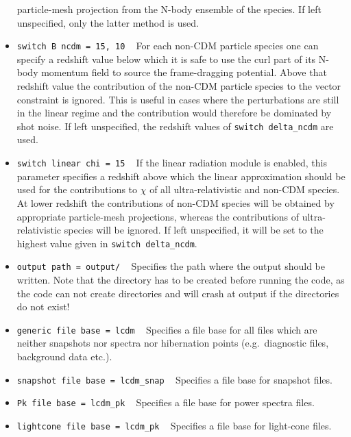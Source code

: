 \documentclass[a4paper,10pt]{article}
\begin{document}
\begin{itemize}
 particle-mesh projection from the N-body ensemble of the species. If left unspecified, only the latter method is used.
 \item[] \hspace{-25pt}\texttt{switch B ncdm = 15, 10} ~ For each non-CDM particle species one can specify a redshift value below which
 it is safe to use the curl part of its N-body momentum field to source the frame-dragging potential. Above that redshift value
 the contribution of the non-CDM particle species to the vector constraint is ignored. This is useful in cases where the perturbations
 are still in the linear regime and the contribution would therefore be dominated by shot noise. If left unspecified, the redshift values
 of \texttt{switch delta\_ncdm} are used.
 \item[] \hspace{-25pt}\texttt{switch linear chi = 15} ~ If the linear radiation module is enabled, this parameter specifies a
 redshift above which the linear approximation should be used for the contributions to $\mathsf{\chi}$ of all ultra-relativistic
 and non-CDM species. At lower redshift the contributions of non-CDM species will be obtained by appropriate particle-mesh projections,
 whereas the contributions of ultra-relativistic species will be ignored. If left unspecified, it will be set to the highest value given
 in \texttt{switch delta\_ncdm}.
 \item[] \hspace{-25pt}\texttt{output path = output/} ~ Specifies the path where the output should be written. Note that the directory has
 to be created before running the code, as the code can not create directories and will crash at output if the directories do not exist!
 \item[] \hspace{-25pt}\texttt{generic file base = lcdm} ~ Specifies a file base for all files which are neither snapshots nor spectra
 nor hibernation points (e.g.\ diagnostic files, background data etc.).
 \item[] \hspace{-25pt}\texttt{snapshot file base = lcdm\_snap} ~ Specifies a file base for snapshot files.
 \item[] \hspace{-25pt}\texttt{Pk file base = lcdm\_pk} ~ Specifies a file base for power spectra files.
 \item[] \hspace{-25pt}\texttt{lightcone file base = lcdm\_pk} ~ Specifies a file base for light-cone files.

\end{itemize}
\end{document}
